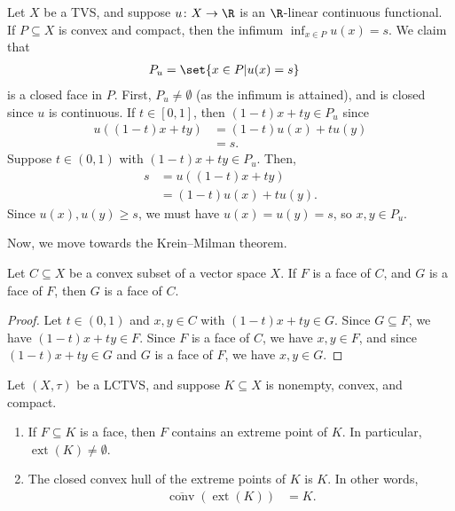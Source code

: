 \documentclass[10pt]{mypackage}
\begin{document}
\begin{example}
  Let $X$ be a TVS, and suppose $u\colon X\rightarrow \R$ is an $\R$-linear continuous functional. If $P\subseteq X$ is convex and compact, then the infimum $\inf_{x\in P}u(x) = s$. We claim that
  \begin{align*}
    P_u &= \set{x\in P | u(x) = s}
  \end{align*}
  is a closed face in $P$. First, $P_u\neq \emptyset$ (as the infimum is attained), and is closed since $u$ is continuous. If $t\in [0,1]$, then $\left(1-t\right)x + ty\in P_u$ since
  \begin{align*}
    u\left(\left(1-t\right)x + ty\right) &= \left(1-t\right)u(x) + tu(y)\\
                                         &= s.
  \end{align*}
  Suppose $t\in (0,1)$ with $\left(1-t\right)x + ty\in P_{u}$. Then,
  \begin{align*}
    s &= u\left(\left(1-t\right)x + ty\right)\\
      &= \left(1-t\right)u(x) + tu(y).
  \end{align*}
  Since $u(x),u(y)\geq s$, we must have $u(x) = u(y) = s$, so $x,y\in P_{u}$.
\end{example}
Now, we move towards the Krein--Milman theorem.
\begin{lemma}
  Let $C\subseteq X$ be a convex subset of a vector space $X$. If $F$ is a face of $C$, and $G$ is a face of $F$, then $G$ is a face of $C$.
\end{lemma}
\begin{proof}
  Let $t\in (0,1)$ and $x,y\in C$ with $\left(1-t\right)x + ty\in G$. Since $G\subseteq F$, we have $\left(1-t\right)x + ty\in F$. Since $F$ is a face of $C$, we have $x,y\in F$, and since $\left(1-t\right)x + ty\in G$ and $G$ is a face of $F$, we have $x,y\in G$.
\end{proof}
\begin{theorem}
  Let $\left(X,\tau\right)$ be a LCTVS, and suppose $K\subseteq X$ is nonempty, convex, and compact.
  \begin{enumerate}[(1)]
    \item If $F\subseteq K$ is a face, then $F$ contains an extreme point of $K$. In particular, $\operatorname{ext}\left(K\right)\neq \emptyset$.
    \item The closed convex hull of the extreme points of $K$ is $K$. In other words,
      \begin{align*}
        \overline{\operatorname{conv}}\left(\operatorname{ext}\left(K\right)\right) &= K.
      \end{align*}
  \end{enumerate}
\end{theorem}
\end{document}
